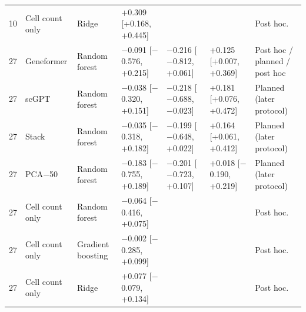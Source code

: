 \begin{tabular}{lllllll}
10 & Cell count only & Ridge & +0.309 [+0.168, +0.445] &  &  & Post hoc. \\
27 & Geneformer & Random forest & $-$0.091 [$-$0.576, +0.215] & $-$0.216 [$-$0.812, +0.061] & +0.125 [+0.007, +0.369] & Post hoc / planned / post hoc \\
27 & scGPT & Random forest & $-$0.038 [$-$0.320, +0.151] & $-$0.218 [$-$0.688, $-$0.023] & +0.181 [+0.076, +0.472] & Planned (later protocol) \\
27 & Stack & Random forest & $-$0.035 [$-$0.318, +0.182] & $-$0.199 [$-$0.648, +0.022] & +0.164 [+0.061, +0.412] & Planned (later protocol) \\
27 & PCA$-$50 & Random forest & $-$0.183 [$-$0.755, +0.189] & $-$0.201 [$-$0.723, +0.107] & +0.018 [$-$0.190, +0.219] & Planned (later protocol) \\
27 & Cell count only & Random forest & $-$0.064 [$-$0.416, +0.075] &  &  & Post hoc. \\
27 & Cell count only & Gradient boosting & $-$0.002 [$-$0.285, +0.099] &  &  & Post hoc. \\
27 & Cell count only & Ridge & +0.077 [$-$0.079, +0.134] &  &  & Post hoc. \\
\bottomrule
\end{tabular}

